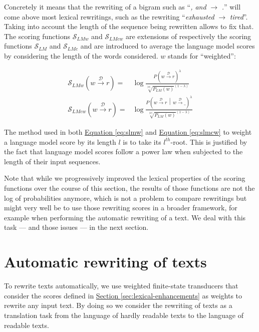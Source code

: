 \documentclass[a4paper, 11pt, onepage]{scrreprt}
\newcommand\sectionref[1]{\hyperref[#1]{Section \ref*{#1}}}
\newcommand\equaref[1]{\hyperref[#1]{Equation \ref*{#1}}}
\newcommand\maps[1]{\xrightarrow{\mathcal{#1}}}
\newcommand\card[1]{\lvert #1 \rvert}
\newcommand\given{\, \middle| \,}
\newcommand\proba[2][]{P_{#1} \left( #2 \right)}
\begin{document}
Concretely it means that the rewriting of a bigram such as “\emph{,
  and} $\rightarrow$ \emph{.}”  will come above most lexical
rewritings, such as the rewriting “\emph{exhausted} $\rightarrow$
\emph{tired}”. Taking into account the length of the sequence being
rewritten allows to fix that. The scoring functions
$\mathcal{S}_{LMw}$ and $\mathcal{S}_{LMcw}$ are extensions of
respectively the scoring functions $\mathcal{S}_{LM}$ and
$\mathcal{S}_{LMc}$ and are introduced to average the language model
scores by considering the length of the words considered. $w$ stands
for “weighted”:

\begin{align}
  \label{eq:slmw}
  \mathcal{S}_{LMw}(w \maps{D} r) = & \log \frac%
  {\proba{w \maps{D} r}^\lambda}%
  {\sqrt[\card{w}]{\proba[LM]{w}}^{(1 - \lambda)}} \\
  \label{eq:slmcw}
  \mathcal{S}_{LMcw}(w \maps{D} r) = & \log \frac%
  {\proba{w \maps{D} r \given w \maps{D} \_}^\lambda}%
  {\sqrt[\card{w}]{\proba[LM]{w}}^{(1 - \lambda)}}
\end{align}

The method used in both \equaref{eq:slmw} and \equaref{eq:slmcw} to
weight a language model score by its length $l$ is to take its
$l^{th}$-root. This is justified by the fact that language model
scores follow a power law when subjected to the length of their input
sequences.

Note that while we progressively improved the lexical properties of
the scoring functions over the course of this section, the results of
those functions are not the log of probabilities anymore, which is not
a problem to compare rewritings but might very well be to use those
rewriting scores in a broader framework, for example when performing
the automatic rewriting of a text. We deal with this task — and those
issues — in the next section.

\section{Automatic rewriting of texts}
\label{sec:rewriting}


To rewrite texts automatically, we use weighted finite-state
transducers that consider the scores defined
in \sectionref{sec:lexical-enhancements} as weights to rewrite any
input text. By doing so we consider the rewriting of texts as a
translation task from the language of hardly readable texts to the
language of readable texts.
\end{document}

